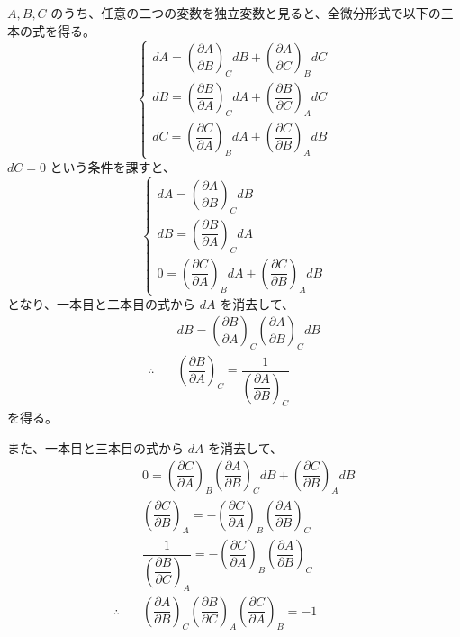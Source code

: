 \documentclass[uplatex,dvipdfmx,a4paper,11pt]{jsarticle}
\begin{document}
\begin{appendix}
\begin{enumerate}
 $A, B, C$ のうち、任意の二つの変数を独立変数と見ると、全微分形式で以下の三本の式を得る。
\begin{equation*}
\begin{cases}
dA = \left(\dfrac{\partial A}{\partial B} \right)_C dB + \left(\dfrac{\partial A}{\partial C} \right)_B dC \\[10pt]
dB = \left(\dfrac{\partial B}{\partial A} \right)_C dA + \left(\dfrac{\partial B}{\partial C} \right)_A dC \\[10pt]
dC = \left(\dfrac{\partial C}{\partial A} \right)_B dA + \left(\dfrac{\partial C}{\partial B} \right)_A dB
\end{cases}
\end{equation*}
$dC= 0$ という条件を課すと、
\begin{equation*}
\begin{cases}
dA = \left(\dfrac{\partial A}{\partial B} \right)_C dB \\[10pt]
dB = \left(\dfrac{\partial B}{\partial A} \right)_C dA \\[10pt]
0 = \left(\dfrac{\partial C}{\partial A} \right)_B dA + \left(\dfrac{\partial C}{\partial B} \right)_A dB
\end{cases}
\end{equation*}
となり、一本目と二本目の式から $dA$ を消去して、
\begin{align*}
&dB = \left(\dfrac{\partial B}{\partial A} \right)_C \left(\dfrac{\partial A}{\partial B} \right)_C dB \\[10pt]
\therefore \quad &\left(\dfrac{\partial B}{\partial A} \right)_{C} = \dfrac{1}{ \left( \dfrac{\partial A}{\partial B} \right)_{C} }
\end{align*}
を得る。

また、一本目と三本目の式から $dA$ を消去して、
\begin{align*}
&0 = \left(\dfrac{\partial C}{\partial A} \right)_B \left(\dfrac{\partial A}{\partial B} \right)_C dB + \left(\dfrac{\partial C}{\partial B} \right)_A dB \\[10pt]
&\left(\dfrac{\partial C}{\partial B} \right)_A = - \left(\dfrac{\partial C}{\partial A} \right)_B \left(\dfrac{\partial A}{\partial B} \right)_C \\[10pt]
&\dfrac{1}{ \left( \dfrac{\partial B}{\partial C} \right)_{A} } = - \left(\dfrac{\partial C}{\partial A} \right)_B \left(\dfrac{\partial A}{\partial B} \right)_C \\[10pt]
\therefore \quad &\left(\dfrac{\partial A}{\partial B} \right)_{C} \left(\dfrac{\partial B}{\partial C} \right)_{A} \left(\dfrac{\partial C}{\partial A} \right)_{B} = -1
\end{align*}



\end{enumerate}
\end{appendix}
\end{document}
